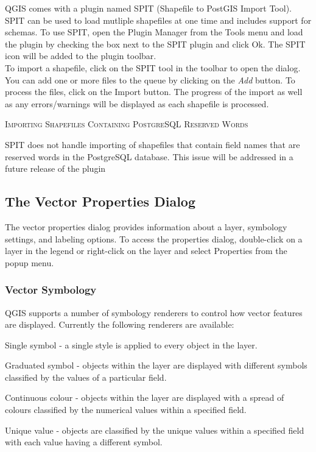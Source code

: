 \documentclass[10pt,english]{article}
\newcommand\qgistip[1]{\raggedright\small{#1}}
\begin{document}
\begin{onehalfspace}
QGIS comes with a plugin named SPIT (Shapefile to PostGIS Import Tool). SPIT can be used to load mutliple shapefiles at one time and includes support for schemas. To use SPIT, open the Plugin Manager from the Tools menu and load the plugin by checking the box next to the SPIT plugin and click Ok. The SPIT icon will be added to the plugin toolbar. \\

To import a shapefile, click on the SPIT tool in the toolbar to open the dialog. You can add one or more files to the queue by clicking on the \textsl{Add} button. To process the files, click on the Import button. The progress of the import as well as any errors/warnings will be displayed as each shapefile is processed.
\begin{Tip}\caption{\textsc{Importing Shapefiles Containing PostgreSQL Reserved Words}}
\qgistip{SPIT does not handle importing of shapefiles that contain field names that are reserved words in the PostgreSQL database. This issue will be addressed in a future release of the plugin
}
\end{Tip} 
\subsection{The Vector Properties Dialog}
The vector properties dialog provides information about a layer, symbology settings, and labeling options. To access the properties dialog, double-click on a layer in the legend or right-click on the layer and select Properties from the popup menu.

\subsubsection{Vector Symbology}\label{sec:symbology}

QGIS supports a number of symbology renderers to control how
vector features are displayed. Currently the following renderers
are available:

\begin{compactdesc}
    \item[Single symbol] - a single style is applied to every
    object in the layer.
    \item[Graduated symbol] - objects within the layer are
    displayed with different symbols classified by the values of a
    particular field.
    \item[Continuous colour] - objects within the layer are
    displayed with a spread of colours classified by the numerical
    values within a specified field.
    \item[Unique value] - objects are classified by the unique
    values within a specified field with each value having a
    different symbol.
\end{compactdesc}


\end{onehalfspace}
\end{document}
